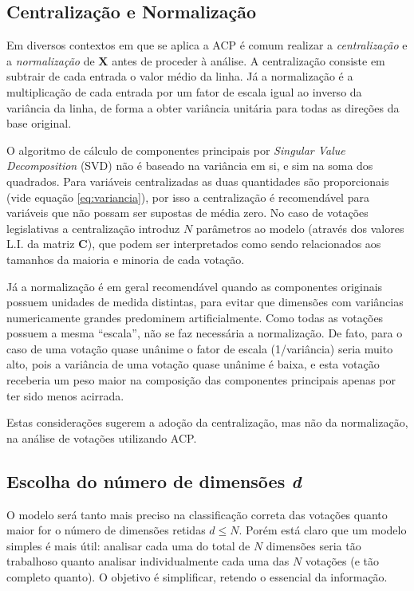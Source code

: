 \documentclass[
	article,			%
	12pt,				%
	oneside,			%
	a4paper,			%
	english,			%
	brazil,				%
	sumario=tradicional,
	oldfontcommands %
	]{abntex2}
\begin{document}
\subsection{Centralização e Normalização}

Em diversos contextos em que se aplica a ACP é comum realizar a \emph{centralização} e a \emph{normalização}  de $\mathbf{X}$ antes de proceder à análise. A centralização consiste em subtrair de cada entrada o valor médio da linha. Já a normalização é a multiplicação de cada entrada por um fator de escala igual ao inverso da variância da linha, de forma a obter variância unitária para todas as direções da base original.

O algoritmo de cálculo de componentes principais por \emph{Singular Value Decomposition} (SVD) não é baseado na variância em si, e sim na soma dos quadrados. Para variáveis centralizadas as duas quantidades são proporcionais (vide equação \ref{eq:variancia}), por isso a centralização é recomendável para variáveis que não possam ser supostas de média zero. No caso de votações legislativas a centralização introduz $N$ parâmetros ao modelo (através dos valores L.I. da matriz $\mathbf{C}$), que podem ser interpretados como sendo relacionados aos tamanhos da maioria e minoria de cada votação.

Já a normalização é em geral recomendável quando as componentes originais possuem unidades de medida distintas, para evitar que dimensões com variâncias numericamente grandes predominem artificialmente. Como todas as votações possuem a mesma ``escala'', não se faz necessária a normalização. De fato, para o caso de uma votação quase unânime o fator de escala (1/variância) seria muito alto, pois a variância de uma votação quase unânime é baixa, e esta votação receberia um peso maior na composição das componentes principais apenas por ter sido menos acirrada.

Estas considerações sugerem a adoção da centralização, mas não da normalização, na análise de votações utilizando ACP.

\subsection{Escolha do número de dimensões \emph{d}}
\label{subsec:dimensoes}

O modelo será tanto mais preciso na classificação correta das votações quanto maior for o número de dimensões retidas $d \leq N$. Porém está claro que um modelo simples é mais útil: analisar cada uma do total de $N$ dimensões seria tão trabalhoso quanto analisar individualmente cada uma das $N$ votações (e tão completo quanto). O objetivo é simplificar, retendo o essencial da informação.
\end{document}
